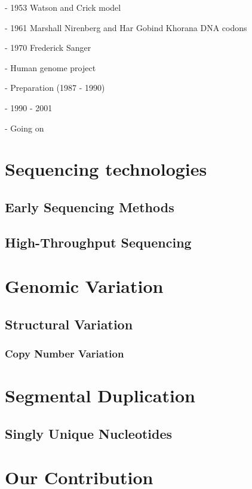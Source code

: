 - 1953 Watson and Crick model

- 1961 Marshall Nirenberg and Har Gobind Khorana DNA codons

- 1970 Frederick Sanger

- Human genome project

    - Preparation (1987 - 1990)

    - 1990 - 2001
    
    - Going on

\newpage
\section{Sequencing technologies}

\subsection{Early Sequencing Methods}
\subsection{High-Throughput Sequencing}
\section{Genomic Variation}
\subsection{Structural Variation}
\subsubsection{Copy Number Variation}
\section{Segmental Duplication}
\subsection{Singly Unique Nucleotides}
\section{Our Contribution}
\newpage
